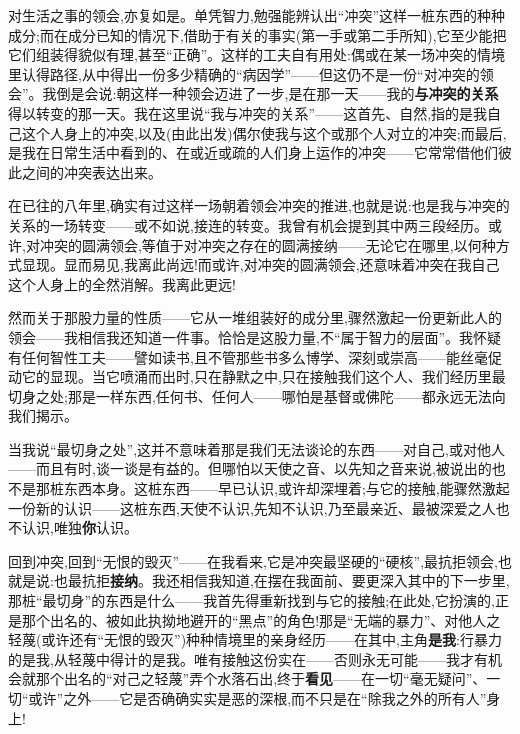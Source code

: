 对生活之事的领会,亦复如是。单凭智力,勉强能辨认出“冲突”这样一桩东西的种种成分;而在成分已知的情况下,借助于有关的事实(第一手或第二手所知),它至少能把它们组装得貌似有理,甚至“正确”。这样的工夫自有用处:偶或在某一场冲突的情境里认得路径,从中得出一份多少精确的“病因学”——但这仍不是一份“对冲突的领会”。我倒是会说:朝这样一种领会迈进了一步,是在那一天——我的\textbf{与冲突的关系}得以转变的那一天\dmark{}。我在这里说“我与冲突的关系”——这首先、自然,指的是我自己这个人身上的冲突,以及(由此出发)偶尔使我与这个或那个人对立的冲突;而最后,是我在日常生活中看到的、在或近或疏的人们身上运作的冲突——它常常借他们彼此之间的冲突表达出来。

在已往的八年里,确实有过这样一场朝着领会冲突的推进,也就是说:也是我与冲突的关系的一场转变——或不如说,接连的转变。我曾有机会提到其中两三段经历。或许,对冲突的圆满领会,等值于对冲突之存在的圆满接纳——无论它在哪里,以何种方式显现。显而易见,我离此尚远!而或许,对冲突的圆满领会,还意味着冲突在我自己这个人身上的全然消解。我离此更远!

然而关于那股力量的性质——它从一堆组装好的成分里,骤然激起一份更新此人的领会——我相信我还知道一件事。恰恰是这股力量,不“属于智力的层面”。我怀疑有任何智性工夫——譬如读书,且不管那些书多么博学、深刻或崇高——能丝毫促动它的显现。当它喷涌而出时,只在静默之中,只在接触我们这个人、我们经历里最切身之处;那是一样东西,任何书、任何人——哪怕是基督或佛陀——都永远无法向我们揭示。

当我说“最切身之处”,这并不意味着那是我们无法谈论的东西——对自己,或对他人——而且有时,谈一谈是有益的。但哪怕以天使之音、以先知之音来说,被说出的也不是那桩东西本身。这桩东西——早已认识,或许却深埋着;与它的接触,能骤然激起一份新的认识——这桩东西,天使不认识,先知不认识,乃至最亲近、最被深爱之人也不认识,唯独\textbf{你}认识。

回到冲突,回到“无恨的毁灭”\dmark{}——在我看来,它是冲突最坚硬的“硬核”,最抗拒领会,也就是说:也最抗拒\textbf{接纳}。我还相信我知道,在摆在我面前、要更深入其中的下一步里,那桩“最切身”的东西是什么——我首先得重新找到与它的接触;在此处,它扮演的,正是那个出名的、被如此执拗地避开的“黑点”的角色!那是“无端的暴力”、对他人之轻蔑(或许还有“无恨的毁灭”)种种情境里的亲身经历——在其中,主角\textbf{是我}:行暴力的是我,从轻蔑中得计的是我。唯有接触这份实在——否则永无可能——我才有机会就那个出名的“对己之轻蔑”弄个水落石出,终于\textbf{看见}——在一切“毫无疑问”、一切“或许”之外——它是否确确实实是恶的深根,而不只是在“除我之外的所有人”身上!

